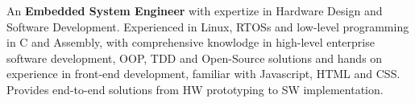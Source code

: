 \nohyphens{\justify
An \textbf{Embedded System Engineer} with expertize in Hardware Design and Software Development. Experienced in Linux,
RTOSs and low-level programming in C and Assembly, with comprehensive knowlodge in high-level
enterprise software development, OOP, TDD and Open-Source solutions and hands on experience in front-end development,
familiar with Javascript, HTML and CSS. Provides end-to-end solutions from HW prototyping to SW implementation.
}
